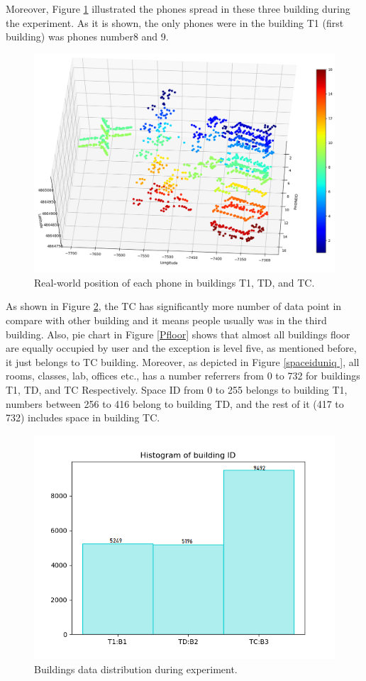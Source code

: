 \documentclass[../UNBThesis2.tex]{subfiles}
\begin{document}
Moreover, Figure \ref{phoneall} illustrated the phones spread in these three building during the experiment. As it is shown, the only phones were in the building T1 (first building) was phones number8 and 9. 


\begin{figure}
    \centering
    \includegraphics[width = 10 cm]{image/Chapters/Chapter6/LatLongUser.png}
    \caption{Real-world position of each phone in buildings T1, TD, and TC.}
    \label{phoneall}
\end{figure}





As shown in Figure \ref{bdd}, the TC has significantly more number of data point in compare with other building  and it means people usually was in the third building. Also, pie chart in Figure \ref{Pfloor} shows that almost all buildings floor are equally occupied by user and the exception is level five, as mentioned before, it just belongs to TC building. Moreover, as depicted in Figure \ref{spaceiduniq }, all rooms, classes, lab, offices etc., has a number referrers from 0 to 732 for  buildings T1, TD, and TC Respectively. Space ID from 0 to 255 belongs to building T1, numbers between 256 to 416 belong to building TD, and the rest of it (417 to 732) includes space in building TC.



\begin{figure}
    \centering
    \includegraphics[width = 12 cm]{image/Chapters/Chapter6/buidlingID.png}
    \caption{Buildings data distribution during experiment. }
    \label{bdd}
\end{figure}
\end{document}
